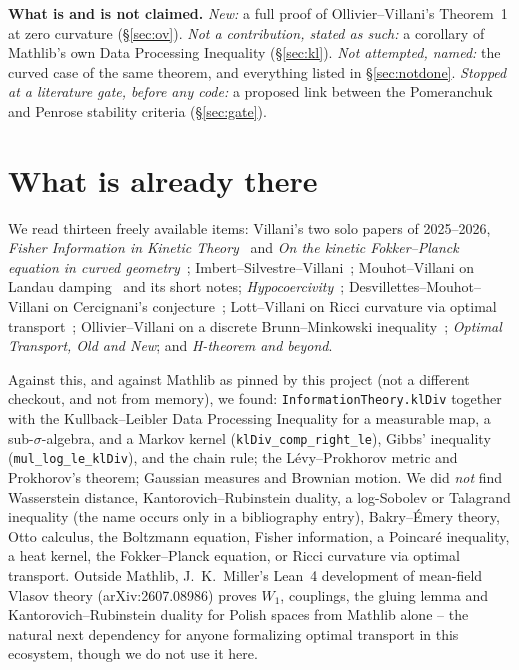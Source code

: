 \documentclass[11pt,a4paper]{article}
\newcommand{\lean}[1]{\texttt{\small #1}}
\begin{document}
\begin{keybox}
\textbf{What is and is not claimed.} \emph{New:} a full proof of Ollivier--Villani's Theorem~1 at zero
curvature (\S\ref{sec:ov}). \emph{Not a contribution, stated as such:} a corollary of Mathlib's own
Data Processing Inequality (\S\ref{sec:kl}). \emph{Not attempted, named:} the curved case of the same
theorem, and everything listed in \S\ref{sec:notdone}. \emph{Stopped at a literature gate, before any
code:} a proposed link between the Pomeranchuk and Penrose stability criteria (\S\ref{sec:gate}).
\end{keybox}

\section{What is already there}
\label{sec:survey}

We read thirteen freely available items: Villani's two solo papers of 2025--2026, \emph{Fisher
Information in Kinetic Theory}~\cite{Villani2025} and \emph{On the kinetic Fokker--Planck equation in
curved geometry}~\cite{Villani2026}; Imbert--Silvestre--Villani~\cite{ISV2024}; Mouhot--Villani on
Landau damping~\cite{MouhotVillani2011} and its short notes; \emph{Hypocoercivity}~\cite{Villani2009};
Desvillettes--Mouhot--Villani on Cercignani's conjecture~\cite{DMV2011}; Lott--Villani on Ricci
curvature via optimal transport~\cite{LottVillani2009,LottVillani2007}; Ollivier--Villani on a discrete
Brunn--Minkowski inequality~\cite{OllivierVillani2012}; \emph{Optimal Transport, Old and New}; and
\emph{H-theorem and beyond}.

Against this, and against Mathlib as pinned by this project (not a different checkout, and not from
memory), we found: \lean{InformationTheory.klDiv} together with the Kullback--Leibler Data Processing
Inequality for a measurable map, a sub-$\sigma$-algebra, and a Markov kernel
(\lean{klDiv\_comp\_right\_le}), Gibbs' inequality (\lean{mul\_log\_le\_klDiv}), and the chain rule; the
L\'evy--Prokhorov metric and Prokhorov's theorem; Gaussian measures and Brownian motion. We did
\emph{not} find Wasserstein distance, Kantorovich--Rubinstein duality, a log-Sobolev or Talagrand
inequality (the name occurs only in a bibliography entry), Bakry--\'Emery theory, Otto calculus, the Boltzmann equation, Fisher information, a Poincar\'e
inequality, a heat kernel, the Fokker--Planck equation, or Ricci curvature via optimal transport.
Outside Mathlib, J.~K.~Miller's Lean~4 development of mean-field Vlasov theory (arXiv:2607.08986) proves
$W_1$, couplings, the gluing lemma and Kantorovich--Rubinstein duality for Polish spaces from Mathlib
alone -- the natural next dependency for anyone formalizing optimal transport in this ecosystem, though
we do not use it here.
\end{document}
